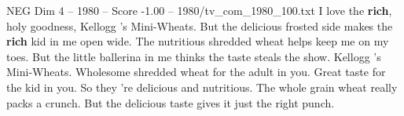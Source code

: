 \begin{textsample}{NEG Dim 4 – 1980 – Score -1.00 – 1980/tv\_com\_1980\_100.txt}  \label{ex:f4_neg_034}
I love the \textbf{rich}, holy goodness, Kellogg 's Mini-Wheats.
But the delicious frosted side makes the \textbf{rich} kid in me open wide.
The nutritious shredded wheat helps keep me on my toes.
But the little ballerina in me thinks the taste steals the show.
Kellogg 's Mini-Wheats.
Wholesome shredded wheat for the adult in you.
Great taste for the kid in you.
So they 're delicious and nutritious.
The whole grain wheat really packs a crunch.
But the delicious taste gives it just the right punch.

\end{textsample}
